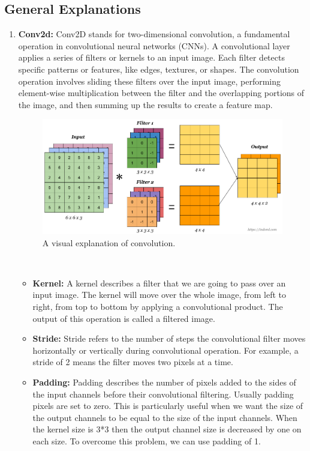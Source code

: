     \subsection{General Explanations}
    \begin{enumerate}
        \item {\bf Conv2d:} Conv2D stands for two-dimensional convolution, a fundamental operation in convolutional neural networks (CNNs). A convolutional layer applies a series of filters or kernels to an input image. Each filter detects specific patterns or features, like edges, textures, or shapes. The convolution operation involves sliding these filters over the input image, performing element-wise multiplication between the filter and the overlapping portions of the image, and then summing up the results to create a feature map.
        \begin{figure}[ht]
            \centering
            \includegraphics[width=5in]{./figures/conv2d.png}
            \caption{A visual explanation of convolution. }
        \end{figure} \\
        \begin{itemize}
            \item {\bf Kernel:} A kernel describes a filter that we are going to pass over an input image. The kernel will move over the whole image, from left to right, from top to bottom by applying a convolutional product. The output of this operation is called a filtered image.
            \item {\bf Stride:} Stride refers to the number of steps the convolutional filter moves horizontally or vertically during convolutional operation. For example, a stride of 2 means the filter moves two pixels at a time.
            \item {\bf Padding:} Padding describes the number of pixels added to the sides of the input channels before their convolutional filtering. Usually padding pixels are set to zero. This is particularly useful when we want the size of the output channels to be equal to the size of the input channels. When the kernel size is  3*3  then the output channel size is decreased by one on each size. To overcome this problem, we can use padding of 1.

\end{itemize}
\end{enumerate}
